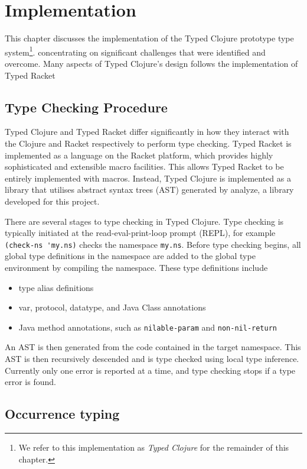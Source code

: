 \chapter{Implementation}

This chapter discusses the implementation of the Typed Clojure prototype type 
system\footnote{We refer to this implementation as \emph{Typed Clojure} for the remainder of this chapter.}.
concentrating on significant challenges that were identified and overcome.
Many aspects of Typed Clojure's design follows the implementation of Typed Racket

\section{Type Checking Procedure}

Typed Clojure and Typed Racket differ significantly in how they interact with
the Clojure and Racket respectively to perform type checking.
Typed Racket is implemented as a language on the
Racket platform, which provides highly sophisticated and extensible macro facilities.
This allows Typed Racket to be entirely implemented with macros.
Instead, Typed Clojure is implemented as a library that utilises abstract syntax trees (AST)
generated by analyze, a library developed for this project.

There are several stages to type checking in Typed Clojure.
Type checking is typically initiated at the read-eval-print-loop prompt (REPL),
for example \lstinline|(check-ns 'my.ns)| checks the namespace \lstinline|my.ns|.
Before type checking begins, all global type definitions in the namespace
are added to the global type environment by compiling the namespace.
These type definitions include

\begin{itemize}
  \item type alias definitions
  \item var, protocol, datatype, and Java Class annotations
  \item Java method annotations, such as \lstinline|nilable-param| and \lstinline|non-nil-return|
\end{itemize}

An AST is then generated from the code contained in the target namespace.
This AST is then recursively descended and is type checked using local type inference.
Currently only one error is reported at a time, and type checking stops if a type error
is found.

\section{Occurrence typing}

